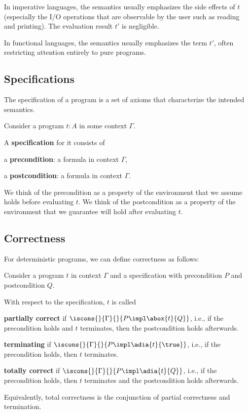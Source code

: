 In imperative languages, the semantics usually emphasizes the side effects of $t$ (especially the I/O operations that are observable by the user such as reading and printing).
The evaluation result $t'$ is negligible.

In functional languages, the semantics usually emphasizes the term $t'$, often restricting attention entirely to pure programs.

\subsection{Specifications}

The specification of a program is a set of axioms that characterize the intended semantics.

\begin{definition}[Specification]
Consider a program $t:A$ in some context $\Gamma$.

A \textbf{specification} for it consists of
\begin{compactitem}
\item a \textbf{precondition}: a formula in context $\Gamma$,
\item a \textbf{postcondition}: a formula in context $\Gamma$.
\end{compactitem}
\end{definition}

We think of the precondition as a property of the environment that we assume holds before evaluating $t$.
We think of the postcondition as a property of the environment that we guarantee will hold after evaluating $t$.

\subsection{Correctness}

For deterministic programs, we can define correctness as follows:

\begin{definition}[Correctness]
Consider a program $t$ in context $\Gamma$ and a specification with precondition $P$ and postcondition $Q$.

With respect to the specification, $t$ is called 
\begin{compactitem}
\item \textbf{partially correct} if $\iscons{}{\Gamma}{}{P\impl \abox{t}{Q}}$, i.e., if the precondition holds and $t$ terminates, then the postcondition holds afterwards.
\item \textbf{terminating} if $\iscons{}{\Gamma}{}{P\impl \adia{t}{\true}}$, i.e., if the precondition holds, then $t$ terminates.
\item \textbf{totally correct} if $\iscons{}{\Gamma}{}{P\impl \adia{t}{Q}}$, i.e., if the precondition holds, then $t$ terminates and the postcondition holds afterwards.
\end{compactitem}
Equivalently, total correctness is the conjunction of partial correctness and termination.
\end{definition}

